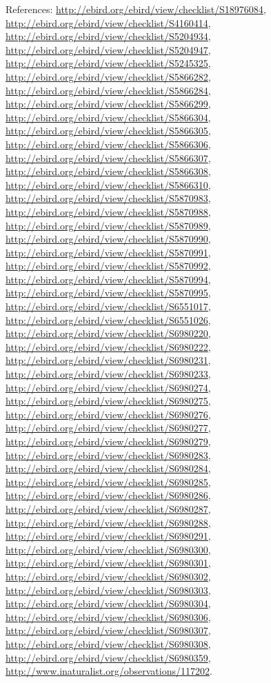 \documentclass[9pt, article]{memoir}
\begin{document}
\begin{multicols}{2}
\vspace{6pt}References: 
\url{http://ebird.org/ebird/view/checklist/S18976084}, 
\url{http://ebird.org/ebird/view/checklist/S4160414}, 
\url{http://ebird.org/ebird/view/checklist/S5204934}, 
\url{http://ebird.org/ebird/view/checklist/S5204947}, 
\url{http://ebird.org/ebird/view/checklist/S5245325}, 
\url{http://ebird.org/ebird/view/checklist/S5866282}, 
\url{http://ebird.org/ebird/view/checklist/S5866284}, 
\url{http://ebird.org/ebird/view/checklist/S5866299}, 
\url{http://ebird.org/ebird/view/checklist/S5866304}, 
\url{http://ebird.org/ebird/view/checklist/S5866305}, 
\url{http://ebird.org/ebird/view/checklist/S5866306}, 
\url{http://ebird.org/ebird/view/checklist/S5866307}, 
\url{http://ebird.org/ebird/view/checklist/S5866308}, 
\url{http://ebird.org/ebird/view/checklist/S5866310}, 
\url{http://ebird.org/ebird/view/checklist/S5870983}, 
\url{http://ebird.org/ebird/view/checklist/S5870988}, 
\url{http://ebird.org/ebird/view/checklist/S5870989}, 
\url{http://ebird.org/ebird/view/checklist/S5870990}, 
\url{http://ebird.org/ebird/view/checklist/S5870991}, 
\url{http://ebird.org/ebird/view/checklist/S5870992}, 
\url{http://ebird.org/ebird/view/checklist/S5870994}, 
\url{http://ebird.org/ebird/view/checklist/S5870995}, 
\url{http://ebird.org/ebird/view/checklist/S6551017}, 
\url{http://ebird.org/ebird/view/checklist/S6551026}, 
\url{http://ebird.org/ebird/view/checklist/S6980220}, 
\url{http://ebird.org/ebird/view/checklist/S6980222}, 
\url{http://ebird.org/ebird/view/checklist/S6980231}, 
\url{http://ebird.org/ebird/view/checklist/S6980233}, 
\url{http://ebird.org/ebird/view/checklist/S6980274}, 
\url{http://ebird.org/ebird/view/checklist/S6980275}, 
\url{http://ebird.org/ebird/view/checklist/S6980276}, 
\url{http://ebird.org/ebird/view/checklist/S6980277}, 
\url{http://ebird.org/ebird/view/checklist/S6980279}, 
\url{http://ebird.org/ebird/view/checklist/S6980283}, 
\url{http://ebird.org/ebird/view/checklist/S6980284}, 
\url{http://ebird.org/ebird/view/checklist/S6980285}, 
\url{http://ebird.org/ebird/view/checklist/S6980286}, 
\url{http://ebird.org/ebird/view/checklist/S6980287}, 
\url{http://ebird.org/ebird/view/checklist/S6980288}, 
\url{http://ebird.org/ebird/view/checklist/S6980291}, 
\url{http://ebird.org/ebird/view/checklist/S6980300}, 
\url{http://ebird.org/ebird/view/checklist/S6980301}, 
\url{http://ebird.org/ebird/view/checklist/S6980302}, 
\url{http://ebird.org/ebird/view/checklist/S6980303}, 
\url{http://ebird.org/ebird/view/checklist/S6980304}, 
\url{http://ebird.org/ebird/view/checklist/S6980306}, 
\url{http://ebird.org/ebird/view/checklist/S6980307}, 
\url{http://ebird.org/ebird/view/checklist/S6980308}, 
\url{http://ebird.org/ebird/view/checklist/S6980359}, 
\url{http://www.inaturalist.org/observations/117202}.


\end{multicols}
\end{document}
